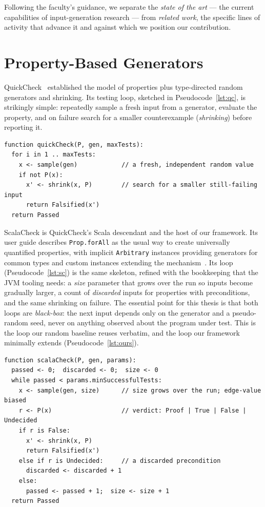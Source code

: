 \documentclass[11pt,a4paper]{report}
\begin{document}
Following the faculty's guidance, we separate the \emph{state of the art} — the current capabilities of
input-generation research — from \emph{related work}, the specific lines of activity that advance it and
against which we position our contribution.

\section{Property-Based Generators}

QuickCheck~\cite{claessen2000} established the model of properties plus type-directed random generators and
shrinking. Its testing loop, sketched in Pseudocode~\ref{lst:qc}, is strikingly simple: repeatedly sample a
fresh input from a generator, evaluate the property, and on failure search for a smaller counterexample
(\emph{shrinking}) before reporting it.

\begin{lstlisting}[caption={The QuickCheck loop. Inputs are sampled independently of one another and of the program under test.},label=lst:qc]
function quickCheck(P, gen, maxTests):
  for i in 1 .. maxTests:
    x <- sample(gen)            // a fresh, independent random value
    if not P(x):
      x' <- shrink(x, P)        // search for a smaller still-failing input
      return Falsified(x')
  return Passed
\end{lstlisting}

ScalaCheck is QuickCheck's Scala descendant and the host of our framework. Its user guide describes
\texttt{Prop.forAll} as the usual way to create universally quantified properties, with implicit
\texttt{Arbitrary} instances providing generators for common types and custom instances extending the
mechanism~\cite{scalacheckguide}. Its loop (Pseudocode~\ref{lst:sc}) is the same skeleton, refined with the
bookkeeping that the JVM tooling needs: a \emph{size} parameter that grows over the run so inputs become
gradually larger, a count of \emph{discarded} inputs for properties with preconditions, and the same shrinking
on failure. The essential point for this thesis is that both loops are \emph{black-box}: the next input
depends only on the generator and a pseudo-random seed, never on anything observed about the program under
test. This is the loop our random baseline reuses verbatim, and the loop our framework minimally extends
(Pseudocode~\ref{lst:ours}).

\begin{lstlisting}[caption={The ScalaCheck loop --- QuickCheck on the JVM, with sized generation and discard accounting. Still black-box: nothing about the SUT influences the next input.},label=lst:sc]
function scalaCheck(P, gen, params):
  passed <- 0;  discarded <- 0;  size <- 0
  while passed < params.minSuccessfulTests:
    x <- sample(gen, size)      // size grows over the run; edge-value biased
    r <- P(x)                   // verdict: Proof | True | False | Undecided
    if r is False:
      x' <- shrink(x, P)
      return Falsified(x')
    else if r is Undecided:     // a discarded precondition
      discarded <- discarded + 1
    else:
      passed <- passed + 1;  size <- size + 1
  return Passed
\end{lstlisting}
\end{document}
